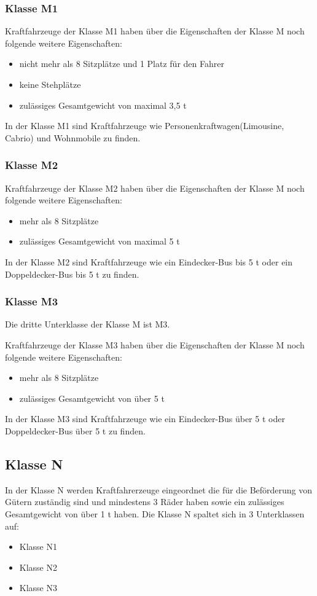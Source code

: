\subsubsection{Klasse M1}
Kraftfahrzeuge der Klasse M1 haben über die Eigenschaften der Klasse M noch folgende weitere Eigenschaften:
\begin{itemize}
	\item {nicht mehr als 8 Sitzplätze und 1 Platz für den Fahrer}
	\item {keine Stehplätze}
	\item {zulässiges Gesamtgewicht von maximal 3,5 \ac{t}}
\end{itemize}

In der Klasse M1 sind Kraftfahrzeuge wie Personenkraftwagen(Limousine, Cabrio) und Wohnmobile zu finden.

\subsubsection{Klasse M2}
Kraftfahrzeuge der Klasse M2 haben über die Eigenschaften der Klasse M noch folgende weitere Eigenschaften:
\begin{itemize}
	\item {mehr als 8 Sitzplätze}
	\item {zulässiges Gesamtgewicht von maximal 5 \ac{t}}
\end{itemize}

In der Klasse M2 sind Kraftfahrzeuge wie ein Eindecker-Bus bis 5 \ac{t} oder ein Doppeldecker-Bus bis 5 \ac{t} zu finden.

\subsubsection{Klasse M3}

Die dritte Unterklasse der Klasse M ist M3.

Kraftfahrzeuge der Klasse M3 haben über die Eigenschaften der Klasse M noch folgende weitere Eigenschaften:
\begin{itemize}
	\item {mehr als 8 Sitzplätze}
	\item {zulässiges Gesamtgewicht von über 5 \ac{t}}
\end{itemize}

In der Klasse M3 sind Kraftfahrzeuge wie ein Eindecker-Bus über 5 \ac{t} oder Doppeldecker-Bus über 5 \ac{t} zu finden.

\subsection{Klasse N}
In der Klasse N werden Kraftfahrerzeuge eingeordnet die für die Beförderung von Gütern zuständig sind und mindestens 3 Räder haben sowie ein zulässiges Gesamtgewicht von über 1 \ac{t} haben.
Die Klasse N spaltet sich in 3 Unterklassen auf:
\begin{itemize}
	\item {Klasse N1}
	\item {Klasse N2}
	\item {Klasse N3}
\end{itemize}

